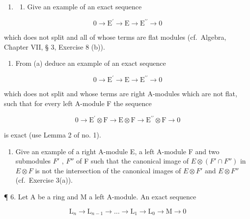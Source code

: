 \begin{enumerate}
\def\labelenumi{\arabic{enumi}.}
\setcounter{enumi}{3}
\tightlist
\item
  \begin{enumerate}
  \def\labelenumii{(\alph{enumii})}
  \tightlist
  \item
    Give an example of an exact sequence
  \end{enumerate}
\end{enumerate}

\[
0 \rightarrow \mathrm{E} ^ {\prime} \rightarrow \mathrm{E} \rightarrow \mathrm{E} ^ {\prime \prime} \rightarrow 0
\]

which does not split and all of whose terms are flat modules (cf.~Algebra, Chapter VII, § 3, Exercise 8 (b)).

\begin{enumerate}
\def\labelenumi{(\alph{enumi})}
\setcounter{enumi}{1}
\tightlist
\item
  From (a) deduce an example of an exact sequence
\end{enumerate}

\[
0 \rightarrow \mathrm{E} ^ {\prime} \rightarrow \mathrm{E} \rightarrow \mathrm{E} ^ {\prime \prime} \rightarrow 0
\]

which does not split and whose terms are right A-modules which are not flat, such that for every left A-module F the sequence

\[
0 \rightarrow \mathrm{E} ^ {\prime} \otimes \mathrm{F} \rightarrow \mathrm{E} \otimes \mathrm{F} \rightarrow \mathrm{E} ^ {\prime \prime} \otimes \mathrm{F} \rightarrow 0
\]

is exact (use Lemma 2 of no. 1).

\begin{enumerate}
\def\labelenumi{\arabic{enumi}.}
\setcounter{enumi}{4}
\tightlist
\item
  Give an example of a right A-module E, a left A-module F and two submodules \(F'\) , \(F''\) of F such that the canonical image of \(E \otimes (F' \cap F'')\) in \(E \otimes F\) is not the intersection of the canonical images of \(E \otimes F'\) and \(E \otimes F''\) (cf.~Exercise 3(a)).
\end{enumerate}

¶ 6. Let A be a ring and M a left A-module. An exact sequence

\[
\mathrm{L} _ {n} \rightarrow \mathrm{L} _ {n - 1} \rightarrow \dots \rightarrow \mathrm{L} _ {1} \rightarrow \mathrm{L} _ {0} \rightarrow \mathrm{M} \rightarrow 0
\]

